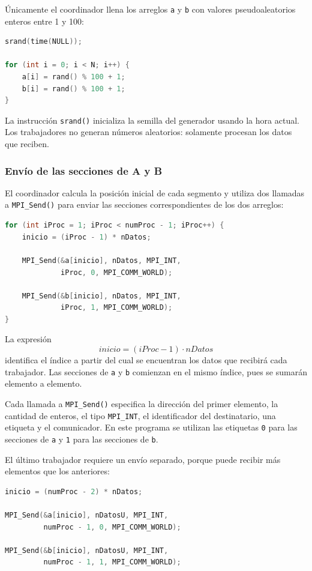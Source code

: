 \documentclass[12pt,a4paper]{article}
\begin{document}
Únicamente el coordinador llena los arreglos \texttt{a} y \texttt{b} con
valores pseudoaleatorios enteros entre 1 y 100:

\begin{lstlisting}[language=C]
srand(time(NULL));

for (int i = 0; i < N; i++) {
    a[i] = rand() % 100 + 1;
    b[i] = rand() % 100 + 1;
}
\end{lstlisting}

La instrucción \texttt{srand()} inicializa la semilla del generador usando la
hora actual. Los trabajadores no generan números aleatorios: solamente
procesan los datos que reciben.

\subsubsection{Envío de las secciones de A y B}

El coordinador calcula la posición inicial de cada segmento y utiliza dos
llamadas a \texttt{MPI\_Send()} para enviar las secciones correspondientes de
los dos arreglos:

\begin{lstlisting}[language=C]
for (int iProc = 1; iProc < numProc - 1; iProc++) {
    inicio = (iProc - 1) * nDatos;

    MPI_Send(&a[inicio], nDatos, MPI_INT,
             iProc, 0, MPI_COMM_WORLD);

    MPI_Send(&b[inicio], nDatos, MPI_INT,
             iProc, 1, MPI_COMM_WORLD);
}
\end{lstlisting}

La expresión
\[
inicio=(iProc-1)\cdot nDatos
\]
identifica el índice a partir del cual se encuentran los datos que recibirá
cada trabajador. Las secciones de \texttt{a} y \texttt{b} comienzan en el
mismo índice, pues se sumarán elemento a elemento.

Cada llamada a \texttt{MPI\_Send()} especifica la dirección del primer
elemento, la cantidad de enteros, el tipo \texttt{MPI\_INT}, el identificador
del destinatario, una etiqueta y el comunicador. En este programa se utilizan
las etiquetas \texttt{0} para las secciones de \texttt{a} y \texttt{1} para
las secciones de \texttt{b}.

El último trabajador requiere un envío separado, porque puede recibir más
elementos que los anteriores:

\begin{lstlisting}[language=C]
inicio = (numProc - 2) * nDatos;

MPI_Send(&a[inicio], nDatosU, MPI_INT,
         numProc - 1, 0, MPI_COMM_WORLD);

MPI_Send(&b[inicio], nDatosU, MPI_INT,
         numProc - 1, 1, MPI_COMM_WORLD);
\end{lstlisting}
\end{document}
